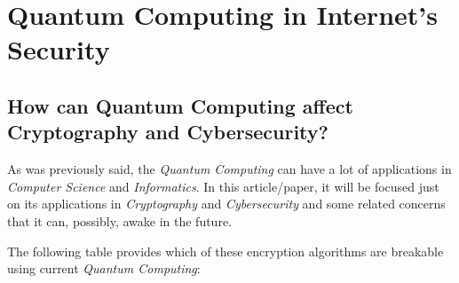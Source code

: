 \documentclass[conference]{IEEEtran}
\begin{document}
\section{Quantum Computing in Internet's Security}

\subsection{How can Quantum Computing affect Cryptography and Cybersecurity?}

As was previously said, the \textit{Quantum Computing} can have a lot of applications in \textit{Computer Science} and \textit{Informatics}. In this article/paper, it will be focused just on its applications in \textit{Cryptography} and \textit{Cybersecurity} and some related concerns that it can, possibly, awake in the future.

\vspace{4pt}

The following table provides which of these encryption algorithms are breakable using current \textit{Quantum Computing}:
\end{document}
